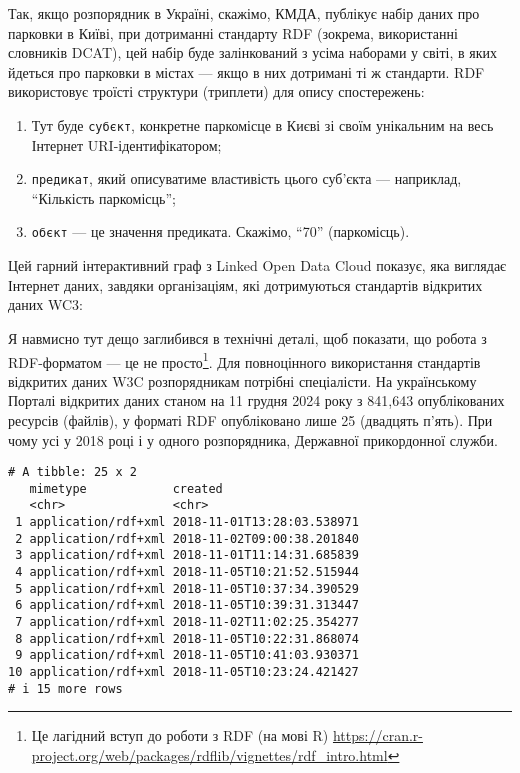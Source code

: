 \documentclass[
]{agujournal2019}
\providecommand{\tightlist}{%
  \setlength{\itemsep}{0pt}\setlength{\parskip}{0pt}}\usepackage{longtable,booktabs,array}
\begin{document}
Так, якщо розпорядник в Україні, скажімо, КМДА, публікує набір даних про
парковки в Київі, при дотриманні стандарту RDF (зокрема, використанні
словників DCAT), цей набір буде залінкований з усіма наборами у світі, в
яких йдеться про парковки в містах --- якщо в них дотримані ті ж
стандарти. RDF використовує троїсті структури (триплети) для опису
спостережень:

\begin{enumerate}
\def\labelenumi{\arabic{enumi}.}
\tightlist
\item
  Тут буде \texttt{суб\textquotesingle{}єкт}, конкретне паркомісце в
  Києві зі своїм унікальним на весь Інтернет URI-ідентифікатором;
\item
  \texttt{предикат}, який описуватиме властивість цього суб'єкта ---
  наприклад, ``Кількість паркомісць'';
\item
  \texttt{об\textquotesingle{}єкт} --- це значення предиката. Скажімо,
  ``70'' (паркомісць).
\end{enumerate}

Цей гарний інтерактивний граф з Linked Open Data Cloud показує, яка
виглядає Інтернет даних, завдяки організаціям, які дотримуються
стандартів відкритих даних WC3:

Я навмисно тут дещо заглибився в технічні деталі, щоб показати, що
робота з RDF-форматом --- це не просто\footnote{Це лагідний вступ до
  роботи з RDF (на мові R)
  \url{https://cran.r-project.org/web/packages/rdflib/vignettes/rdf_intro.html}}.
Для повноцінного використання стандартів відкритих даних W3C
розпорядникам потрібні спеціалісти. На українському Порталі відкритих
даних станом на 11 грудня 2024 року з 841,643 опублікованих ресурсів
(файлів), у форматі RDF опубліковано лише 25 (двадцять п'ять). При чому
усі у 2018 році і у одного розпорядника, Державної прикордонної служби.

\begin{verbatim}
# A tibble: 25 x 2
   mimetype            created                   
   <chr>               <chr>                     
 1 application/rdf+xml 2018-11-01T13:28:03.538971
 2 application/rdf+xml 2018-11-02T09:00:38.201840
 3 application/rdf+xml 2018-11-01T11:14:31.685839
 4 application/rdf+xml 2018-11-05T10:21:52.515944
 5 application/rdf+xml 2018-11-05T10:37:34.390529
 6 application/rdf+xml 2018-11-05T10:39:31.313447
 7 application/rdf+xml 2018-11-02T11:02:25.354277
 8 application/rdf+xml 2018-11-05T10:22:31.868074
 9 application/rdf+xml 2018-11-05T10:41:03.930371
10 application/rdf+xml 2018-11-05T10:23:24.421427
# i 15 more rows
\end{verbatim}
\end{document}
